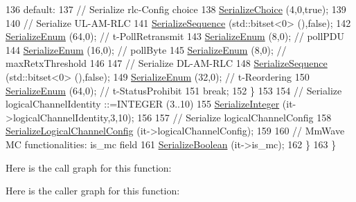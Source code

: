 \begin{DoxyCode}
136         \textcolor{keywordflow}{default}:
137           \textcolor{comment}{// Serialize rlc-Config choice}
138           \hyperlink{classns3_1_1Asn1Header_a400ef4a710499da80fc55e23a973d4fa}{SerializeChoice} (4,0,\textcolor{keyword}{true});
139 
140           \textcolor{comment}{// Serialize UL-AM-RLC}
141           \hyperlink{classns3_1_1Asn1Header_aa9744858380443ed95836fed08799aed}{SerializeSequence} (std::bitset<0> (),\textcolor{keyword}{false});
142           \hyperlink{classns3_1_1Asn1Header_ac8e56956823ab8e4470c09e162e7bf24}{SerializeEnum} (64,0);  \textcolor{comment}{// t-PollRetransmit}
143           \hyperlink{classns3_1_1Asn1Header_ac8e56956823ab8e4470c09e162e7bf24}{SerializeEnum} (8,0);   \textcolor{comment}{// pollPDU}
144           \hyperlink{classns3_1_1Asn1Header_ac8e56956823ab8e4470c09e162e7bf24}{SerializeEnum} (16,0);  \textcolor{comment}{// pollByte}
145           \hyperlink{classns3_1_1Asn1Header_ac8e56956823ab8e4470c09e162e7bf24}{SerializeEnum} (8,0);   \textcolor{comment}{// maxRetxThreshold}
146 
147           \textcolor{comment}{// Serialize DL-AM-RLC}
148           \hyperlink{classns3_1_1Asn1Header_aa9744858380443ed95836fed08799aed}{SerializeSequence} (std::bitset<0> (),\textcolor{keyword}{false});
149           \hyperlink{classns3_1_1Asn1Header_ac8e56956823ab8e4470c09e162e7bf24}{SerializeEnum} (32,0);  \textcolor{comment}{// t-Reordering}
150           \hyperlink{classns3_1_1Asn1Header_ac8e56956823ab8e4470c09e162e7bf24}{SerializeEnum} (64,0);  \textcolor{comment}{// t-StatusProhibit}
151           \textcolor{keywordflow}{break};
152         \}
153 
154       \textcolor{comment}{// Serialize logicalChannelIdentity ::=INTEGER (3..10)}
155       \hyperlink{classns3_1_1Asn1Header_ab1c3bd37730affa7473bc759d625c29a}{SerializeInteger} (it->logicalChannelIdentity,3,10);
156 
157       \textcolor{comment}{// Serialize logicalChannelConfig}
158       \hyperlink{classns3_1_1RrcAsn1Header_a3e43cd3672501a6c4118405157fdeb79}{SerializeLogicalChannelConfig} (it->logicalChannelConfig);
159 
160       \textcolor{comment}{// MmWave MC functionalities: is\_mc field}
161       \hyperlink{classns3_1_1Asn1Header_a28e3626acdffec71c0376f4f3e7e7ec4}{SerializeBoolean} (it->is\_mc);
162     \}
163 \}
\end{DoxyCode}


Here is the call graph for this function\+:




Here is the caller graph for this function\+:


